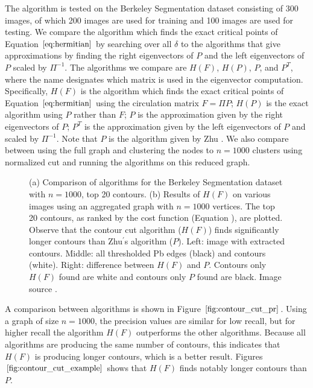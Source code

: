 \documentclass{SMBV12}
\begin{document}
The algorithm is tested on the Berkeley Segmentation dataset consisting of 300 images, of which 200 images are used for training and 100 images are used for testing. We compare the algorithm which finds the exact critical points of Equation $\ref{eq:hermitian}$ by searching over all $\delta$ to the algorithms that give approximations by finding the right eigenvectors of $P$ and the left eigenvectors of $P$ scaled by $\Pi^{-1}$. The algorithms we compare are $H(F)$, $H(P)$, $P$, and $P^T$, where the name designates which matrix is used in the eigenvector computation. Specifically, $H(F)$ is the algorithm which finds the exact critical points of Equation $\ref{eq:hermitian}$ using the circulation matrix $F = \Pi P$; $H(P)$ is the exact algorithm using $P$ rather than $F$; $P$ is the approximation given by the right eigenvectors of $P$; $P^T$ is the approximation given by the left eigenvectors of $P$ and scaled by $\Pi^{-1}$. Note that $P$ is the algorithm given by Zhu \cite{zhu2007untangling}. We also compare between using the full graph and clustering the nodes to $n = 1000$ clusters using normalized cut \cite{shi2000normalized} and running the algorithms on this reduced graph.
\begin{figure}[htbp]
    \centering
    \caption{(a) Comparison of algorithms for the Berkeley Segmentation dataset with $n = 1000$, top 20 contours. (b) Results of $H(F)$ on various images using an aggregated graph with $n = 1000$ vertices. The top 20 contours, as ranked by the cost function (Equation ), are plotted. Observe that the contour cut algorithm ($H(F)$) finds significantly longer contours than Zhu$^\prime$s algorithm ($P$). Left: image with extracted contours. Middle: all thresholded Pb edges (black) and contours (white). Right: difference between $H(F)$ and $P$. Contours only $H(F)$ found are white and contours only $P$ found are black. Image source \cite{KenGalShi2011}.}
\end{figure}
A comparison between algorithms is shown in Figure $\ref{fig:contour_cut_pr}$. Using a graph of size $n = 1000$, the precision values are similar for low recall, but for higher recall the algorithm $H(F)$ outperforms the other algorithms. Because all algorithms are producing the same number of contours, this indicates that $H(F)$ is producing longer contours, which is a better result. Figures $\ref{fig:contour_cut_example}$ shows that $H(F)$ finds notably longer contours than $P$.
\end{document}
